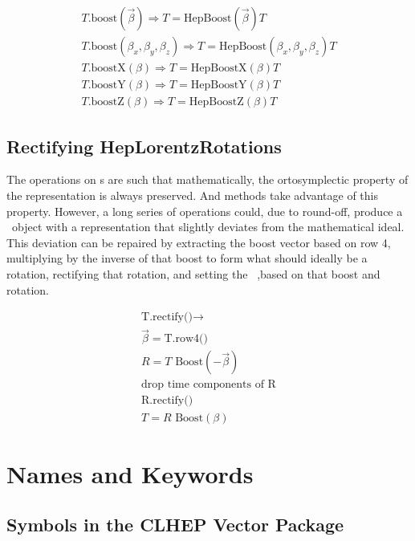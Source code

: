 \begin{eqnarray}
\label{eq:ltboost}
  T\mbox{.boost}(\vec{\beta}) \Longrightarrow T = 
		\mbox{HepBoost}(\vec{\beta}) T \\
\nonumber
  T\mbox{.boost}(\beta_x, \beta_y, \beta_z) \Longrightarrow T = 
		\mbox{HepBoost}(\beta_x, \beta_y, \beta_z) T \\
\nonumber
  T\mbox{.boostX}(\beta) \Longrightarrow T = \mbox{HepBoostX}(\beta) T \\
\nonumber
  T\mbox{.boostY}(\beta) \Longrightarrow T = \mbox{HepBoostY}(\beta) T \\
\nonumber
  T\mbox{.boostZ}(\beta) \Longrightarrow T = \mbox{HepBoostZ}(\beta) T 
\end{eqnarray}


\subsection{Rectifying HepLorentzRotations}

The operations on \LT s are such that mathematically, the ortosymplectic
property of 
the representation is always preserved.  And methods take advantage of this 
property. 
However, a long series of operations could, due to round-off, produce a 
\LT\ object with a representation that slightly deviates from the  mathematical
ideal.  This deviation can be repaired by extracting the boost vector based on
row 4, multiplying by the inverse of that boost to form what should ideally be 
a rotation, rectifying that rotation, and setting the \LT\ ,based on that boost
and rotation.

\begin{eqnarray}
\label{eq:rectLT}
\mbox{T.rectify()} \rightarrow \nonumber \\
  \vec{\beta} = \mbox {T.row4()} \nonumber \\
  R = T \mbox{ Boost}(-\vec{\beta})   \nonumber \\
  \mbox {drop time components of R} \nonumber \\
  \mbox {R.rectify()} 		    \nonumber \\
  T = R \mbox{ Boost}(\beta)
\end{eqnarray}

\newpage
\section{Names and Keywords}

\subsection {Symbols in the CLHEP Vector Package} 

